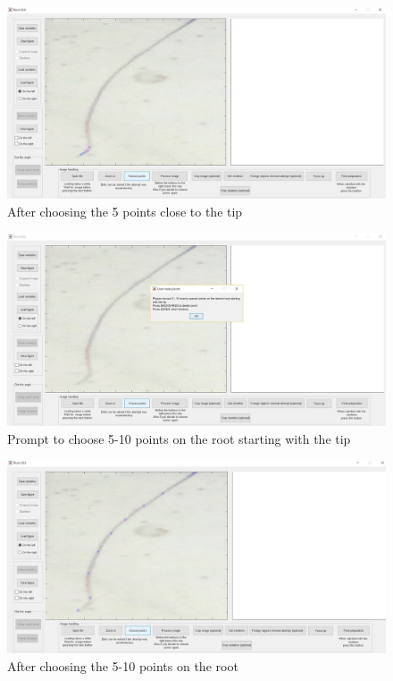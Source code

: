 \begin{figure}[H]
	\centering
	\includegraphics[width=\textwidth]{../Figures/manual/step8.jpg}
	\caption{After choosing the 5 points close to the tip}
	\label{fig:img11}
\end{figure}

\begin{figure}[H]
	\centering
	\includegraphics[width=\textwidth]{../Figures/manual/step9.jpg}
	\caption{Prompt to choose 5-10 points on the root starting with the tip}
	\label{fig:img12}
\end{figure}

\begin{figure}[H]
	\centering
	\includegraphics[width=\textwidth]{../Figures/manual/step10.jpg}
	\caption{After choosing the 5-10 points on the root}
	\label{fig:img13}
\end{figure}

